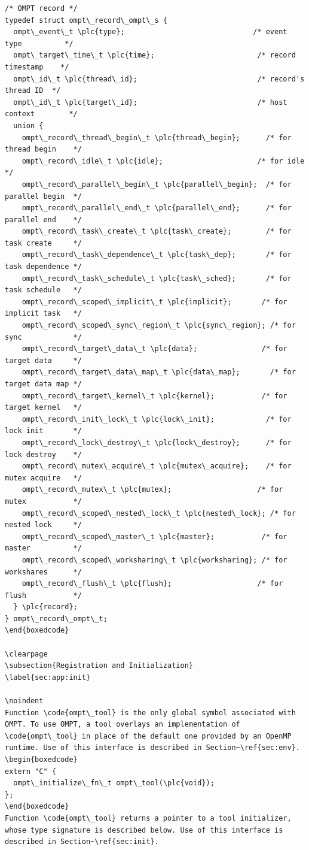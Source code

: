 \documentclass{article}
\begin{document}
\begin{boxedcode}
\begin{verbatim}
/* OMPT record */
typedef struct ompt\_record\_ompt\_s {
  ompt\_event\_t \plc{type};                              /* event type          */
  ompt\_target\_time\_t \plc{time};                        /* record timestamp    */
  ompt\_id\_t \plc{thread\_id};                            /* record's thread ID  */
  ompt\_id\_t \plc{target\_id};                            /* host context        */
  union {
    ompt\_record\_thread\_begin\_t \plc{thread\_begin};      /* for thread begin    */
    ompt\_record\_idle\_t \plc{idle};                      /* for idle            */
    ompt\_record\_parallel\_begin\_t \plc{parallel\_begin};  /* for parallel begin  */
    ompt\_record\_parallel\_end\_t \plc{parallel\_end};      /* for parallel end    */
    ompt\_record\_task\_create\_t \plc{task\_create};        /* for task create     */
    ompt\_record\_task\_dependence\_t \plc{task\_dep};       /* for task dependence */
    ompt\_record\_task\_schedule\_t \plc{task\_sched};       /* for task schedule   */
    ompt\_record\_scoped\_implicit\_t \plc{implicit};       /* for implicit task   */
    ompt\_record\_scoped\_sync\_region\_t \plc{sync\_region}; /* for sync            */
    ompt\_record\_target\_data\_t \plc{data};               /* for target data     */
    ompt\_record\_target\_data\_map\_t \plc{data\_map};       /* for target data map */
    ompt\_record\_target\_kernel\_t \plc{kernel};           /* for target kernel   */
    ompt\_record\_init\_lock\_t \plc{lock\_init};            /* for lock init       */
    ompt\_record\_lock\_destroy\_t \plc{lock\_destroy};      /* for lock destroy    */
    ompt\_record\_mutex\_acquire\_t \plc{mutex\_acquire};    /* for mutex acquire   */
    ompt\_record\_mutex\_t \plc{mutex};                    /* for mutex           */
    ompt\_record\_scoped\_nested\_lock\_t \plc{nested\_lock}; /* for nested lock     */
    ompt\_record\_scoped\_master\_t \plc{master};           /* for master          */
    ompt\_record\_scoped\_worksharing\_t \plc{worksharing}; /* for workshares      */
    ompt\_record\_flush\_t \plc{flush};                    /* for flush           */
  } \plc{record};
} ompt\_record\_ompt\_t;
\end{boxedcode}

\clearpage
\subsection{Registration and Initialization} 
\label{sec:app:init}

\noindent
Function \code{ompt\_tool} is the only global symbol associated with OMPT. To use OMPT, a tool overlays an implementation of \code{ompt\_tool} in place of the default one provided by an OpenMP runtime. Use of this interface is described in Section~\ref{sec:env}.
\begin{boxedcode}
extern "C" {
  ompt\_initialize\_fn\_t ompt\_tool(\plc{void});
};
\end{boxedcode}
Function \code{ompt\_tool} returns a pointer to a tool initializer, whose type signature is described below. Use of this interface is described in Section~\ref{sec:init}.


\end{verbatim}
\end{boxedcode}
\end{document}
